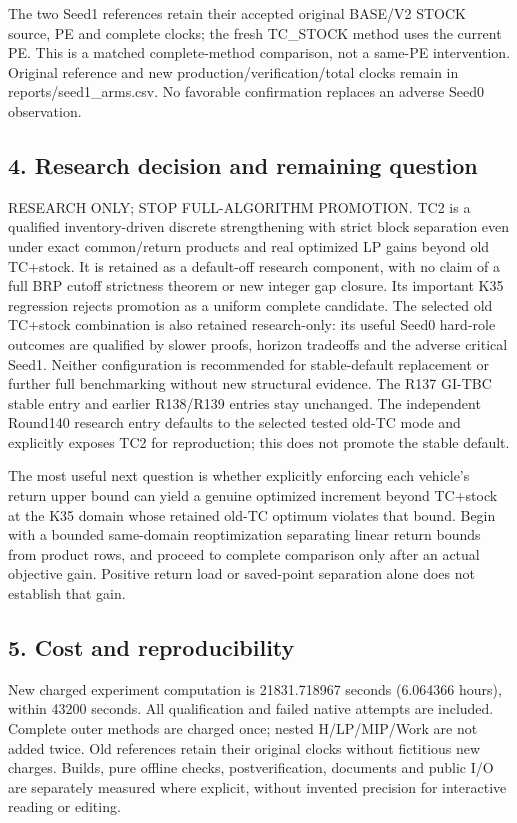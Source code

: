 \documentclass[
  american,
  11pt,
]{article}
\begin{document}
The two Seed1 references retain their accepted original BASE/V2 STOCK
source, PE and complete clocks; the fresh TC\_\allowbreak{}STOCK method uses the
current PE. This is a matched complete-method comparison, not a same-PE
intervention. Original reference and new production/verification/total
clocks remain in reports/seed1\_\allowbreak{}arms.csv. No favorable confirmation
replaces an adverse Seed0 observation.

\subsection{4. Research decision and remaining
question}\label{research-decision-and-remaining-question}

RESEARCH ONLY; STOP FULL-ALGORITHM PROMOTION. TC2 is a qualified
inventory-driven discrete strengthening with strict block separation
even under exact common/return products and real optimized LP gains
beyond old TC+stock. It is retained as a default-off research component,
with no claim of a full BRP cutoff strictness theorem or new integer gap
closure. Its important K35 regression rejects promotion as a uniform
complete candidate. The selected old TC+stock combination is also
retained research-only: its useful Seed0 hard-role outcomes are
qualified by slower proofs, horizon tradeoffs and the adverse critical
Seed1. Neither configuration is recommended for stable-default
replacement or further full benchmarking without new structural
evidence. The R137 GI-TBC stable entry and earlier R138/R139 entries
stay unchanged. The independent Round140 research entry defaults to the
selected tested old-TC mode and explicitly exposes TC2 for reproduction;
this does not promote the stable default.

The most useful next question is whether explicitly enforcing each
vehicle's return upper bound can yield a genuine optimized increment
beyond TC+stock at the K35 domain whose retained old-TC optimum violates
that bound. Begin with a bounded same-domain reoptimization separating
linear return bounds from product rows, and proceed to complete
comparison only after an actual objective gain. Positive return load or
saved-point separation alone does not establish that gain.

\subsection{5. Cost and reproducibility}\label{cost-and-reproducibility}

New charged experiment computation is 21831.718967 seconds (6.064366
hours), within 43200 seconds. All qualification and failed native
attempts are included. Complete outer methods are charged once; nested
H/LP/MIP/Work are not added twice. Old references retain their original
clocks without fictitious new charges. Builds, pure offline checks,
postverification, documents and public I/O are separately measured where
explicit, without invented precision for interactive reading or editing.
\end{document}
